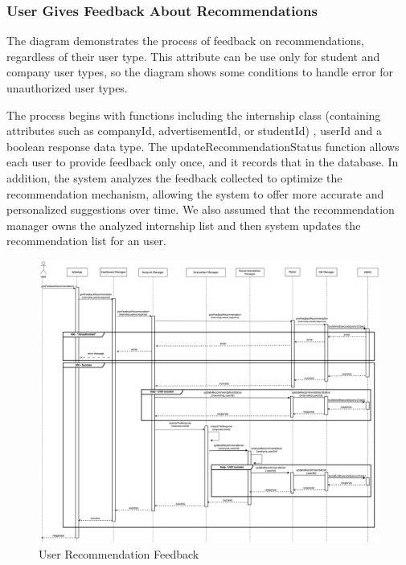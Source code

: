 \documentclass[a4paper,12pt]{article}
\begin{document}
\newpage

\subsubsection*{ User Gives Feedback About Recommendations}  

The diagram demonstrates the process of feedback on recommendations, regardless of their user type. This attribute can be use only for student and company user types, so the diagram shows some conditions to handle error for unauthorized user types. 

The process begins with functions including the internship class (containing attributes such as companyId, advertisementId, or studentId) , userId and a boolean response data type. The updateRecommendationStatus function allows each user to provide feedback only once, and it records that in the database. 
 In addition, the system analyzes the feedback collected to optimize the recommendation mechanism, allowing the system to offer more accurate and personalized suggestions over time. We also assumed that the recommendation manager owns the analyzed internship list and then system updates the recommendation list for an user.
    \begin{figure}[H]
    \centering
    \includegraphics[scale = 0.25]{DD_figures/RuntimeView/userGiveFeedbackRecomm.drawio.png}
    \caption{User Recommendation Feedback}
\end{figure}

\newpage
\end{document}
